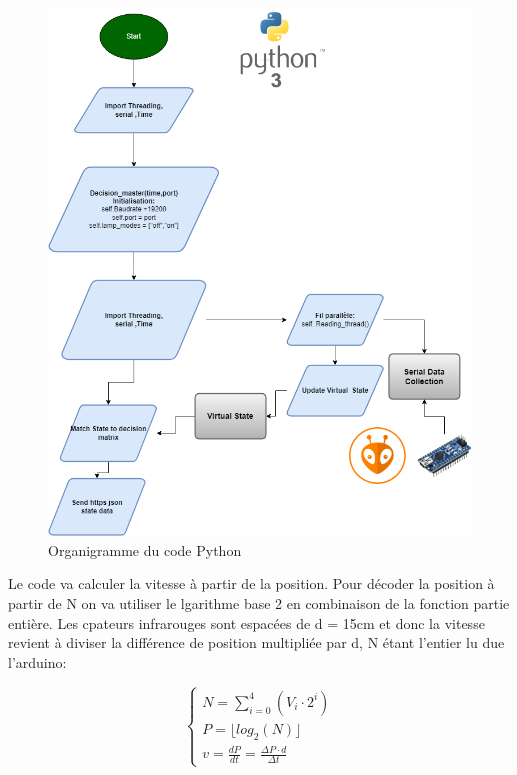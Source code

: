 \documentclass[journal]{IEEEtran}
\begin{document}
\begin{figure}[htbp]
    \centerline{\includegraphics[scale = 0.18]{Trottoir_Flowchart.drawio.png}}
    \caption{Organigramme du code Python}
    \label{fig5}
\end{figure} 

Le code va calculer la vitesse  à partir de la position. Pour décoder la position à partir de N on va utiliser le lgarithme base 2 en combinaison de la fonction partie entière. Les cpateurs infrarouges
sont espacées de d = 15cm et donc la vitesse revient à diviser la différence de position multipliée par d, N étant l'entier lu due l'arduino:

\begin{equation}\label{eq-2}
    \left\{\begin{aligned}
        N = \sum_{i=0}^{4}(V_i\cdot 2^i) \\
        P =  \lfloor{log_2(N)}\rfloor \\
        v = \frac{dP}{dt} = \frac{\Delta P \cdot d}{\Delta t}
    \end{aligned} \right. 
\end{equation}
\end{document}
